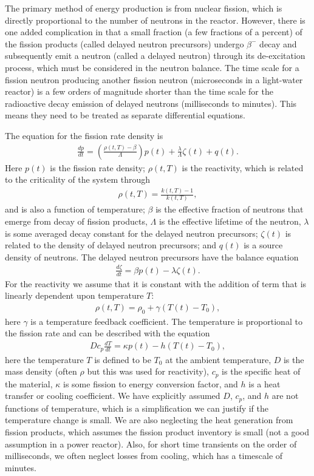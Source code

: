 The primary method of energy production is from nuclear fission, which is directly proportional to the number of neutrons in the reactor. However, there is one added complication in that a small fraction (a few fractions of a percent) of the fission products (called delayed neutron precursors) undergo $\beta^-$ decay and subsequently emit a neutron (called a delayed neutron) through its de-excitation process, which must be considered in the neutron balance. The time scale for a fission neutron producing another fission neutron (microseconds in a light-water reactor) is a few orders of magnitude shorter than the time scale for the radioactive decay emission of delayed neutrons (milliseconds to minutes). This means they need to be treated as separate differential equations.

The equation for the fission rate density is
\begin{align}
  \frac{dp}{dt} = \left( \frac{ \rho(t,T) - \beta }{ \Lambda } \right) p(t) + \frac{\lambda}{\Lambda} \zeta(t) + q(t).
\end{align}
Here $p(t)$ is the fission rate density; $\rho(t,T)$ is the reactivity, which is related to the criticality of the system through
\begin{align}
  \rho(t,T) = \frac{ k(t,T) - 1 }{ k(t,T) }, 
\end{align}
and is also a function of temperature; $\beta$ is the effective fraction of neutrons that emerge from decay of fission products, $\Lambda$ is the effective lifetime of the neutron, $\lambda$ is some averaged decay constant for the delayed neutron precursors; $\zeta(t)$ is related to the density of delayed neutron precursors; and $q(t)$ is a source density of neutrons. The delayed neutron precursors have the balance equation
\begin{align}
  \frac{d\zeta}{dt} = \beta p(t) - \lambda \zeta(t).
\end{align}
For the reactivity we assume that it is constant with the addition of term that is linearly dependent upon temperature $T$:
\begin{align}
  \rho(t,T) = \rho_0 + \gamma ( T(t) - T_0 ),
\end{align}
here $\gamma$ is a temperature feedback coefficient. The temperature is proportional to the fission rate and can be described with the equation
\begin{align}
  D c_p \frac{dT}{dt} = \kappa p(t) - h ( T(t) - T_0 ),
\end{align}
here the temperature $T$ is defined to be $T_0$ at the ambient temperature, $D$ is the mass density (often $\rho$ but this was used for reactivity), $c_p$ is the specific heat of the material, $\kappa$ is some fission to energy conversion factor, and $h$ is a heat transfer or cooling coefficient. We have explicitly assumed $D$, $c_p$, and $h$ are not functions of temperature, which is a simplification we can justify if the temperature change is small. We are also neglecting the heat generation from fission products, which assumes the fission product inventory is small (not a good assumption in a power reactor). Also, for short time transients on the order of milliseconds, we often neglect losses from cooling, which has a timescale of minutes.

